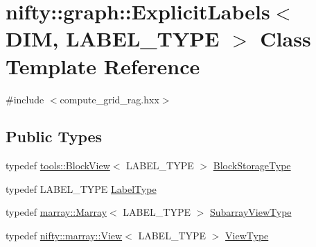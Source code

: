 \hypertarget{classnifty_1_1graph_1_1ExplicitLabels}{}\section{nifty\+:\+:graph\+:\+:Explicit\+Labels$<$ D\+IM, L\+A\+B\+E\+L\+\_\+\+T\+Y\+PE $>$ Class Template Reference}
\label{classnifty_1_1graph_1_1ExplicitLabels}


{\ttfamily \#include $<$compute\+\_\+grid\+\_\+rag.\+hxx$>$}

\subsection*{Public Types}
\begin{DoxyCompactItemize}
\item 
typedef \hyperlink{classnifty_1_1tools_1_1BlockView}{tools\+::\+Block\+View}$<$ L\+A\+B\+E\+L\+\_\+\+T\+Y\+PE $>$ \hyperlink{classnifty_1_1graph_1_1ExplicitLabels_a896653b58048ec52d8e00800279d9b53}{Block\+Storage\+Type}
\item 
typedef L\+A\+B\+E\+L\+\_\+\+T\+Y\+PE \hyperlink{classnifty_1_1graph_1_1ExplicitLabels_a3defd2851b5e7071f23a0fdea7aafff0}{Label\+Type}
\item 
typedef \hyperlink{classandres_1_1Marray}{marray\+::\+Marray}$<$ L\+A\+B\+E\+L\+\_\+\+T\+Y\+PE $>$ \hyperlink{classnifty_1_1graph_1_1ExplicitLabels_ae07fe2aed8059beb43b043e8a3becdb7}{Subarray\+View\+Type}
\item 
typedef \hyperlink{classandres_1_1View}{nifty\+::marray\+::\+View}$<$ L\+A\+B\+E\+L\+\_\+\+T\+Y\+PE $>$ \hyperlink{classnifty_1_1graph_1_1ExplicitLabels_aaab98314403b95503bf0c32e65fd1884}{View\+Type}
\end{DoxyCompactItemize}
